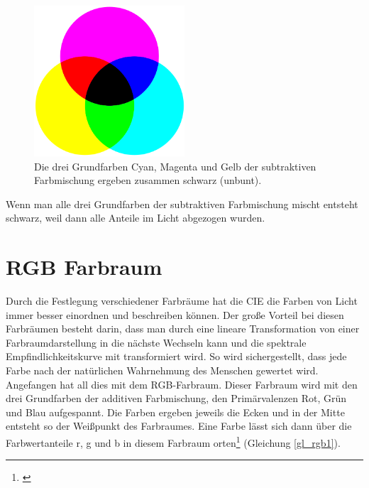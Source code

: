 \begin{figure}[H]     %
\centering
\includegraphics[width=0.5\textwidth]{bilder/farben-} 
\caption {Die drei Grundfarben Cyan, Magenta und Gelb der subtraktiven Farbmischung ergeben zusammen schwarz (unbunt).\protect\footnotemark}\label{b_farben-}
\end{figure}



Wenn man alle drei Grundfarben der subtraktiven Farbmischung mischt entsteht schwarz, weil dann alle Anteile im Licht abgezogen wurden.



 
\section{RGB Farbraum} \label{sec_rgb}
Durch die Festlegung verschiedener Farbräume hat die CIE die Farben von Licht immer besser einordnen und beschreiben können. Der große Vorteil bei diesen Farbräumen besteht darin, dass man durch eine lineare Transformation von einer Farbraumdarstellung in die nächste Wechseln kann und die spektrale Empfindlichkeitskurve mit transformiert wird. So wird sichergestellt, dass jede Farbe nach der natürlichen Wahrnehmung des Menschen gewertet wird.
Angefangen hat all dies mit dem RGB-Farbraum. Dieser Farbraum wird mit den drei Grundfarben der additiven Farbmischung, den Primärvalenzen Rot, Grün und Blau aufgespannt. Die Farben ergeben jeweils die Ecken und in der Mitte entsteht so der Weißpunkt des Farbraumes. Eine Farbe lässt sich dann über die Farbwertanteile r, g und b in diesem Farbraum orten\footnote{\cite[106]{hentschel}} (Gleichung \ref{gl_rgb1}).

